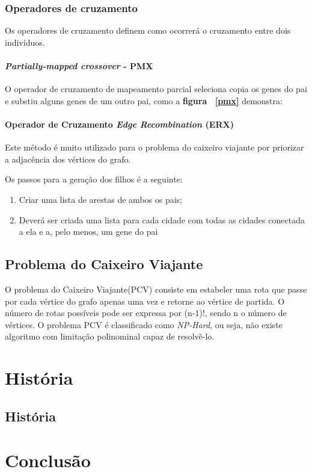 \documentclass{abnt}
\begin{document}
		\subsection{Operadores de cruzamento}

			Os operadores de cruzamento definem como ocorrerá o cruzamento entre dois indivíduos.

		\subsubsection{\textit{Partially-mapped crossover} - PMX} 

			O operador de cruzamento de mapeamento parcial seleciona copia os genes do pai e substiu alguns genes de um outro pai, como a \textbf{figura ~\ref{pmx}} demonstra:


		\subsubsection{Operador de Cruzamento \textit{Edge Recombination} (ERX)}

			Este método é muito utilizado para o problema do caixeiro viajante por priorizar a adjacência dos vértices do grafo.

			Os passos para a geração dos filhos é a seguinte:

			\begin{enumerate}
				\item Criar uma lista de arestas de ambos os pais;
				\item Deverá ser criada uma lista para cada cidade com todas as cidades conectada a ela e a, pelo menos, um gene do pai
			\end{enumerate}


		\section{Problema do Caixeiro Viajante}

		O problema do Caixeiro Viajante(PCV) consiste em estabeler uma rota que passe por cada vértice do grafo apenas uma vez e retorne ao vértice de partida. O número de rotas possíveis pode ser expressa por (n-1)!, sendo n o número de vértices.
		O problema PCV é classificado como \textit{NP-Hard}, ou seja, não existe algoritmo com limitação polinominal capaz de resolvẽ-lo.\cite{0010-pdf}


	\chapter{História}
	\section{História}
	
	\chapter{Conclusão}
	
	
	\nocite{R7}
	\nocite{fisio}
	\nocite{olhar}
	
	
\end{document}
